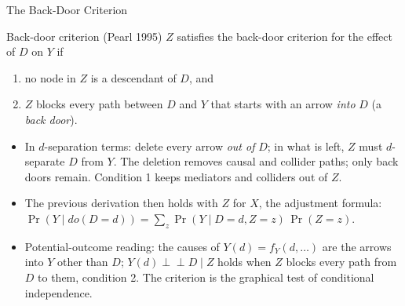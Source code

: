 \documentclass[aspectratio=169,11pt,xcolor=dvipsnames]{beamer}
\newcommand{\srcp}[1]{{\scriptsize\color{gray}(#1)}}
\newcommand{\indep}{\perp\!\!\!\perp}
\newcommand{\core}{\,\raisebox{0.6pt}{\textcolor{corestar}{$\bigstar$}}}
\begin{document}
\begin{frame}{The Back-Door Criterion\core}
\begin{block}{Back-door criterion \srcp{Pearl 1995}}
$Z$ satisfies the back-door criterion for the effect of $D$ on $Y$ if
\begin{enumerate}\itemsep1pt
  \item no node in $Z$ is a descendant of $D$, and
  \item $Z$ blocks every path between $D$ and $Y$ that starts with an arrow
        \emph{into} $D$ (a \emph{back door}).
\end{enumerate}
\end{block}
\begin{itemize}\itemsep1pt
  \item In $d$-separation terms: delete every arrow \emph{out of} $D$; in
        what is left, $Z$ must $d$-separate $D$ from $Y$. The deletion
        removes causal and collider paths; only back doors remain.
        Condition 1 keeps mediators and colliders out of $Z$.
  \item The previous derivation then holds with $Z$ for $X$, the
        \alert{adjustment formula}:
        $\Pr(Y \mid do(D = d)) = \sum_z \Pr(Y \mid D = d, Z = z)\,\Pr(Z = z)$.
  \item Potential-outcome reading: the causes of $Y(d) = f_Y(d, \ldots)$
        are the arrows into $Y$ other than $D$; $Y(d) \indep D \mid Z$
        holds when $Z$ blocks every path from $D$ to them, condition 2.
        The criterion is the graphical test of conditional independence.
\end{itemize}
\end{frame}
\end{document}
